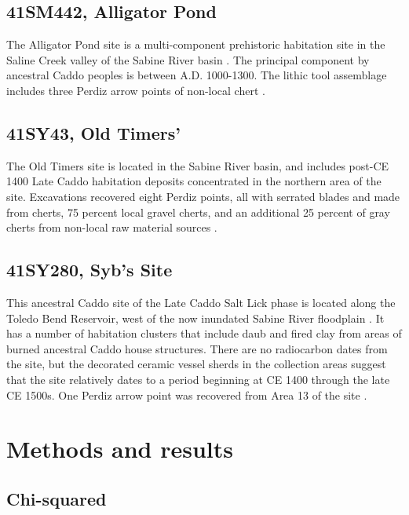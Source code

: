 \documentclass[review]{elsarticle}
\begin{document}
\subsection*{41SM442, Alligator Pond}

The Alligator Pond site is a multi-component prehistoric habitation site in the Saline Creek valley of the Sabine River basin \citep{RN2375,RN2374}. The principal component by ancestral Caddo peoples is between A.D. 1000-1300. The lithic tool assemblage includes three Perdiz arrow points of non-local chert \citep[Figure 19c, e, j]{RN2374}.

\subsection*{41SY43, Old Timers'}

The Old Timers site is located in the Sabine River basin, and includes post-CE 1400 Late Caddo habitation deposits concentrated in the northern area of the site. Excavations recovered eight Perdiz points, all with serrated blades and made from cherts, 75 percent local gravel cherts, and an additional 25 percent of gray cherts from non-local raw material sources \citep[77]{RN8966}.

\subsection*{41SY280, Syb’s Site} 

This ancestral Caddo site of the Late Caddo Salt Lick phase is located along the Toledo Bend Reservoir, west of the now inundated Sabine River floodplain \citep[Figure 55]{RN8966}. It has a number of habitation clusters that include daub and fired clay from areas of burned ancestral Caddo house structures. There are no radiocarbon dates from the site, but the decorated ceramic vessel sherds in the collection areas suggest that the site relatively dates to a period beginning at CE 1400 through the late CE 1500s. One Perdiz arrow point was recovered from Area 13 of the site \citep[Table 33]{RN8966}.

\section*{Methods and results}

\subsection*{Chi-squared}
\end{document}

